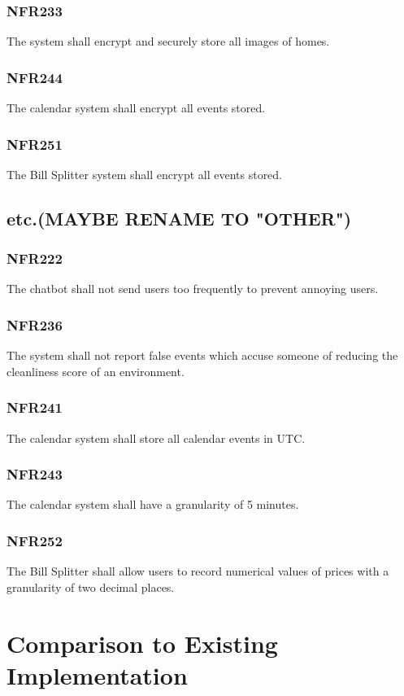 \documentclass[12pt, titlepage]{article}
\begin{document}
\subsubsection{NFR233}
The system shall encrypt and securely store all images of homes.
\subsubsection{NFR244}
The calendar system shall encrypt all events stored.
\subsubsection{NFR251}
The Bill Splitter system shall encrypt all events stored.


\subsection{etc.(MAYBE RENAME TO "OTHER")}
\subsubsection{NFR222}
The chatbot shall not send users too frequently to prevent
annoying users.
\subsubsection{NFR236}
The system shall not report false events which accuse someone of
reducing the cleanliness score of an environment.
\subsubsection{NFR241}
The calendar system shall store all calendar events in UTC.
\subsubsection{NFR243}
The calendar system shall have a granularity of 5 minutes.
\subsubsection{NFR252}
The Bill Splitter shall allow users to record numerical values of
prices with a granularity of two decimal places.

\section{Comparison to Existing Implementation}	
\end{document}
